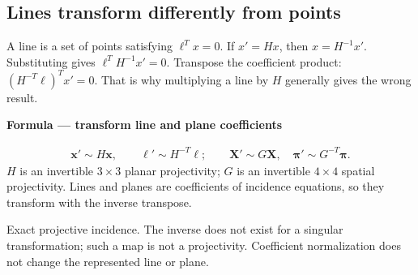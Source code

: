 \documentclass[letterpaper,11pt,english,openany,oneside]{jupyterBook}
\begin{document}
\subsection{Lines transform differently from points}
\label{\detokenize{lectures/lecture01/transformations:lines-transform-differently-from-points}}
\sphinxAtStartPar
A line is a set of points satisfying \(\ell^Tx=0\). If \(x'=Hx\), then \(x=H^{-1}x'\). Substituting gives \(\ell^TH^{-1}x'=0\). Transpose the coefficient product: \((H^{-T}\ell)^Tx'=0\). That is why multiplying a line by \(H\) generally gives the wrong result.

\begin{TextbookBox}
\textbf{Formula — transform line and plane coefficients}\par\smallskip
\begin{equation}\label{equation:lectures/lecture01/transformations:eq-lec01-dual}
\begin{split}\mathbf{x}'\sim H\mathbf{x},\qquad
\boldsymbol\ell'\sim H^{-T}\boldsymbol\ell;
\qquad
\mathbf{X}'\sim G\mathbf{X},\quad\boldsymbol\pi'\sim G^{-T}\boldsymbol\pi.\end{split}
\end{equation}
\sphinxAtStartPar
\(H\) is an invertible \(3\times3\) planar projectivity; \(G\) is an invertible \(4\times4\) spatial projectivity. Lines and planes are  coefficients of incidence equations, so they transform with the inverse transpose.

\sphinxAtStartPar
{} Exact projective incidence. The inverse does not exist for a singular transformation; such a map is not a projectivity. Coefficient normalization does not change the represented line or plane.

\end{TextbookBox}
\end{document}
